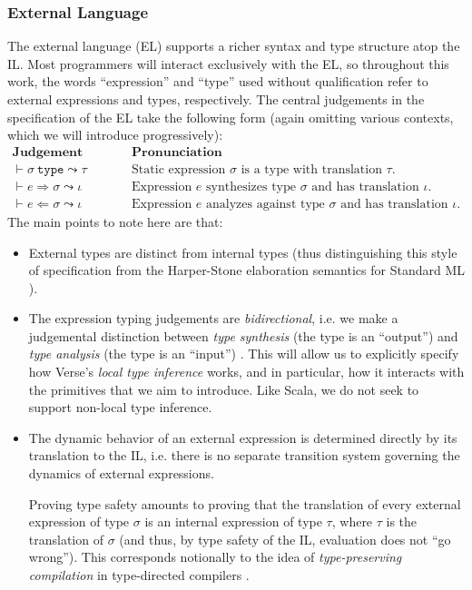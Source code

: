 \subsubsection{External Language}
The external language (EL) supports a richer syntax and type structure atop the IL. Most programmers will interact exclusively with the EL, so throughout this work, the words ``expression'' and ``type'' used without qualification refer to external expressions and types, respectively. The central judgements in the specification of the EL take the following form  (again omitting various contexts, which we will introduce progressively): 
\\[1ex]
$\begin{array}{ll}
\textbf{Judgement Form} & \textbf{Pronunciation}\\
\vdash \sigma~\mathtt{type} \leadsto \tau & \text{Static expression $\sigma$ is a type with translation $\tau$.}\\
\vdash e \Rightarrow \sigma \leadsto \iota & \text{Expression $e$ synthesizes type $\sigma$ and has translation $\iota$.}\\
\vdash e \Leftarrow \sigma \leadsto \iota & \text{Expression $e$ analyzes against type $\sigma$ and has translation $\iota$.}
\end{array}
$\\[1ex]The main points to note here are that:
\begin{itemize}
\item External types are distinct from internal types (thus distinguishing this style of specification from the Harper-Stone elaboration semantics for Standard ML \cite{Harper00atype-theoretic}).
\item The expression typing judgements are \emph{bidirectional}, i.e. we make a judgemental distinction between \emph{type synthesis} (the type is an ``output'') and \emph{type analysis} (the type is an ``input'') \cite{Pierce:2000:LTI:345099.345100}. This will  allow us to explicitly specify how Verse's \emph{local type inference} works, and in particular, how it interacts with the primitives that we aim to introduce. Like Scala, we do not seek to support non-local type inference. %
\item  The dynamic behavior of an external expression is determined directly by its translation to the IL, i.e. there is no separate transition system governing the dynamics of external expressions. 

Proving type safety amounts to proving that the translation of every external expression of type $\sigma$ is an internal expression of type $\tau$, where $\tau$ is the translation of $\sigma$ (and thus, by type safety of the IL, evaluation does not ``go wrong''). This corresponds notionally to the idea of \emph{type-preserving compilation} in type-directed compilers \cite{tarditi+:til-OLD}.
\end{itemize}

